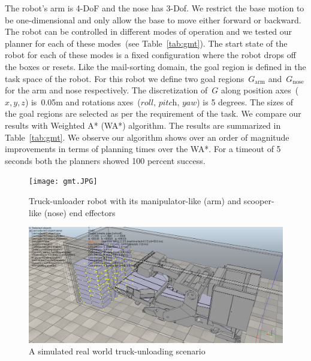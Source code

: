 \documentclass[a4paper]{report}
\begin{document}
The robot's arm is 4-DoF and the nose has 3-Dof. We restrict the base motion to be one-dimensional and only allow the base to move either forward or backward. The robot can be controlled in different modes of operation and we tested our planner for each of these modes~(see Table~\ref{tab:gmt}). The start state of the robot for each of these modes is a fixed configuration where the robot drops off the boxes or resets. Like the mail-sorting domain, the goal region is defined in the task space of the robot. For this robot we define two goal regions~$G_{\textrm{arm}}$ and~$G_{\textrm{nose}}$ for the arm and nose respectively. The discretization of~$G$ along position axes~($x,y,z$) is~0.05m and rotations axes~($\textit{roll, pitch, yaw}$) is 5 degrees. The sizes of the goal regions are selected as per the requirement of the task.
We compare our results with Weighted A* (WA*) algorithm. The results are summarized in Table~\ref{tab:gmt}. We observe our algorithm shows over an order of magnitude improvements in terms of planning times over the WA*. For a timeout of 5 seconds both the planners showed 100 percent success.

\begin{figure}
\centering
 \texttt{[image: gmt.JPG]}
  \caption{
  Truck-unloader robot with its manipulator-like (arm) and scooper-like (nose) end effectors
}
    \label{fig:gmt}
\end{figure}

\begin{figure}
\centering
 \includegraphics[width=\textwidth]{gmt_sim.png}
  \caption{
  A simulated real world truck-unloading scenario
}
    \label{fig:gmt_sim}
\end{figure}
\end{document}
